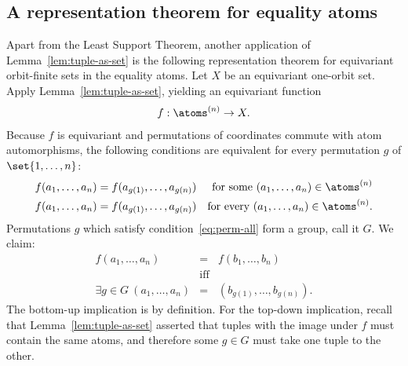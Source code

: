 \subsection*{A representation theorem for equality atoms} Apart from the Least Support Theorem, another application of Lemma~\ref{lem:tuple-as-set} is the following representation theorem for equivariant orbit-finite sets in the equality atoms.
Let $X$ be an equivariant one-orbit set. Apply Lemma~\ref{lem:tuple-as-set}, yielding an equivariant function
 \begin{align*}
 f : \atoms^{(n)} \to X.
 \end{align*}
 Because $f$ is equivariant and permutations of coordinates commute with atom automorphisms, the following conditions are equivalent for every permutation $g$ of $\set{1,\ldots,n}$:
 \begin{eqnarray}
 \label{eq:perm-some} f(a_1,\ldots,a_n) = f(a_{g(1)},\ldots,a_{g(n)}) & & \text{for some $(a_1,\ldots,a_n) \in \atoms^{(n)}$}\\
 \label{eq:perm-all} f(a_1,\ldots,a_n) = f(a_{g(1)},\ldots,a_{g(n)}) & & \text{for every $(a_1,\ldots,a_n) \in \atoms^{(n)}$}.
 \end{eqnarray}
 Permutations $g$ which satisfy condition~\eqref{eq:perm-all} form a group, call it $G$. We claim:
 \begin{eqnarray*}
 f(a_1,\ldots,a_n) &=& f(b_1,\ldots,b_n)\\ & \text{iff} & \\ \exists g \in G\ (a_1,\ldots,a_n)&=& (b_{g(1)},\ldots,b_{g(n)}).
 \end{eqnarray*}
 The bottom-up implication is by definition. For the top-down implication, recall that Lemma~\ref{lem:tuple-as-set} asserted that tuples with the image under $f$ must contain the same atoms, and therefore some $g \in G$ must take one tuple to the other. 
 

